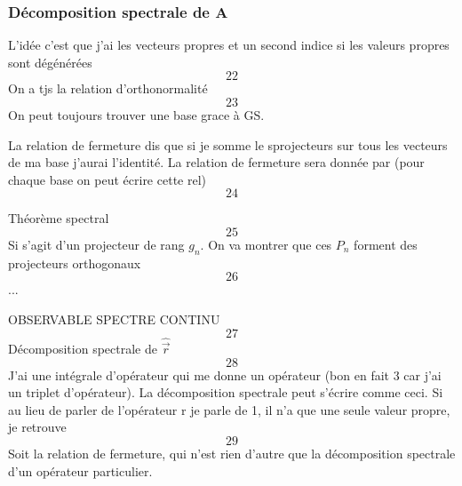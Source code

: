 \subsubsection{Décomposition spectrale de A}
L'idée c'est que j'ai les vecteurs propres et un second indice si les valeurs propres sont dégénérées
\begin{equation}
22
\end{equation}
On a tjs la relation d'orthonormalité
\begin{equation}
23
\end{equation}
On peut toujours trouver une base grace à GS.

La relation de fermeture dis que si je somme le sprojecteurs sur tous les 
vecteurs de ma base j'aurai l'identité. La relation de fermeture sera donnée 
par (pour chaque base on peut écrire cette rel)
\begin{equation}
24
\end{equation}

Théorème spectral
\begin{equation}
25
\end{equation}
Si s'agit d'un projecteur de rang $g_n$. On va montrer que ces $P_n$ forment
des projecteurs orthogonaux
\begin{equation}
26
\end{equation}
...


OBSERVABLE SPECTRE CONTINU
\begin{equation}
27
\end{equation}
Décomposition spectrale de $\hat{\vec{r}}$
\begin{equation}
28
\end{equation}
J'ai une intégrale d'opérateur qui me donne un opérateur (bon en fait 3 car
j'ai un triplet d'opérateur). La décomposition spectrale peut s'écrire comme 
ceci. Si au lieu de parler de l'opérateur r je parle de 1, il n'a que une 
seule valeur propre, je retrouve
\begin{equation}
29
\end{equation}
Soit la relation de fermeture, qui n'est rien d'autre que la décomposition 
spectrale d'un opérateur particulier.\\


